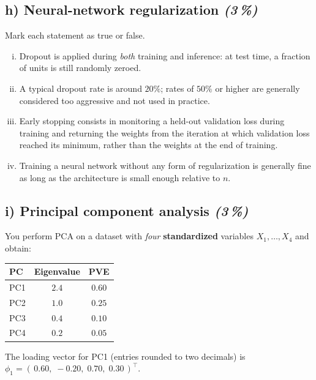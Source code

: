 \documentclass[11pt,a4paper]{article}
\newcommand{\subpoints}[1]{\textit{(#1\,\%)}}
\begin{document}
\subsection*{h) Neural-network regularization \subpoints{3}}
Mark each statement as true or false.
\begin{enumerate}[(i)]
  \item Dropout is applied during \emph{both} training and inference: at test time, a fraction of units is still randomly zeroed.
  \item A typical dropout rate is around $20\%$; rates of $50\%$ or higher are generally considered too aggressive and not used in practice.
  \item Early stopping consists in monitoring a held-out validation loss during training and returning the weights from the iteration at which validation loss reached its minimum, rather than the weights at the end of training.
  \item Training a neural network without any form of regularization is generally fine as long as the architecture is small enough relative to $n$.
\end{enumerate}

\subsection*{i) Principal component analysis \subpoints{3}}

You perform PCA on a dataset with \emph{four} \textbf{standardized} variables $X_1,\dots,X_4$ and obtain:

\begin{center}\small
\begin{tabular}{lcc}
\toprule
\textbf{PC} & \textbf{Eigenvalue} & \textbf{PVE} \\
\midrule
PC1 & $2.4$ & $0.60$ \\
PC2 & $1.0$ & $0.25$ \\
PC3 & $0.4$ & $0.10$ \\
PC4 & $0.2$ & $0.05$ \\
\bottomrule
\end{tabular}
\end{center}

The loading vector for PC1 (entries rounded to two decimals) is
$\phi_1 = (\,0.60,\;-0.20,\;0.70,\;0.30\,)^\top.$
\end{document}
